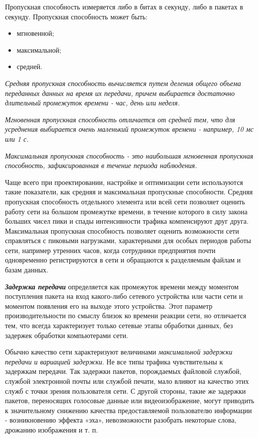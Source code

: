 Пропускная способность измеряется либо в битах в секунду, либо в пакетах в секунду.
Пропускная способность может быть:
\begin{itemize}
    \item мгновенной;
    \item максимальной;
    \item средней.
\end{itemize}

\emph{Средняя пропускная способность вычисляется путем деления общего объема переданных данных на время их передачи, причем выбирается достаточно длительный промежуток времени - час, день или неделя.}

\emph{Мгновенная пропускная способность отличается от средней тем, что для усреднения выбирается очень маленький промежуток времени - например, 10 мс или 1 с.}

\emph{Максимальная пропускная способность - это наибольшая мгновенная пропускная способность, зафиксированная в течение периода наблюдения.}

Чаще всего при проектировании, настройке и оптимизации сети используются такие показатели, как средняя и максимальная пропускные способности.
Средняя пропускная способность отдельного элемента или всей сети позволяет оценить работу сети на большом промежутке времени, в течение которого в силу закона больших чисел пики и спады интенсивности трафика компенсируют друг друга.
Максимальная пропускная способность позволяет оценить возможности сети справляться с пиковыми нагрузками, характерными для особых периодов работы сети, например утренних часов, когда сотрудники предприятия почти одновременно регистрируются в сети и обращаются к разделяемым файлам и базам данных.

\textbf{\textit{Задержка передачи}} определяется как промежуток времени между моментом поступления пакета на вход какого-либо сетевого устройства или части сети и моментом появления его на выходе этого устройства.
Этот параметр производительности по смыслу близок ко времени реакции сети, но отличается тем, что всегда характеризует только сетевые этапы обработки данных, без задержек обработки компьютерами сети.

Обычно качество сети характеризуют величинами \emph{максимальной задержки передачи и вариацией задержки}.
Не все типы трафика чувствительны к задержкам передачи.
Так задержки пакетов, порождаемых файловой службой, службой электронной почты или службой печати, мало влияют на качество этих служб с точки зрения пользователя сети.
С другой стороны, такие же задержки пакетов, переносящих голосовые данные или видеоизображение, могут приводить к значительному снижению качества предоставляемой пользователю информации - возникновению эффекта «эха», невозможности разобрать некоторые слова, дрожанию изображения и т.
п.

